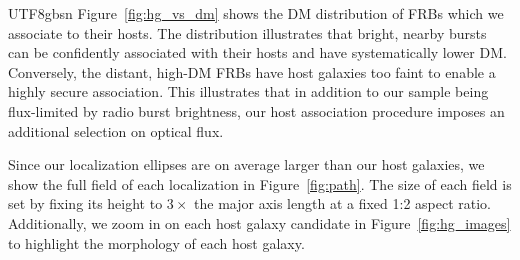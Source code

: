 \documentclass[twocolumn,linenumbers]{aastex631}
\begin{document}
\begin{CJK*}{UTF8}{gbsn}
Figure~\ref{fig:hg_vs_dm} shows the DM distribution of FRBs which we associate to their hosts. The distribution illustrates that bright, nearby bursts can be confidently associated with their hosts and have systematically lower DM. Conversely, the distant, high-DM FRBs have host galaxies too faint to enable a highly secure association. This illustrates that in addition to our sample being flux-limited by radio burst brightness, our host association procedure imposes an additional selection on optical flux.

Since our localization ellipses are on average larger than our host galaxies, we show the full field of each localization in Figure~\ref{fig:path}. The size of each field is set by fixing its height to $3 \times$ the major axis length at a fixed 1:2 aspect ratio. Additionally, we zoom in on each host galaxy candidate in Figure~\ref{fig:hg_images} to highlight the morphology of each host galaxy. %



\end{CJK*}
\end{document}
